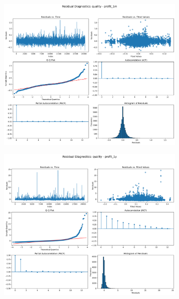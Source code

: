 \documentclass[11pt,english,a4paper,hidelinks]{book}
\begin{document}
\begin{figure}[H]
    \centering
    \begin{subfigure}[b]{0.32\textwidth}
        \centering
        \includegraphics[width=\textwidth]{images/code/models/linear_regression/first_model/AF/quality_profit_1m_residuals.png}
    \end{subfigure}
    \hfill
    \begin{subfigure}[b]{0.32\textwidth}
        \centering
        \includegraphics[width=\textwidth]{images/code/models/linear_regression/first_model/AF/quality_profit_1y_residuals.png}

\end{subfigure}
\end{figure}
\end{document}

